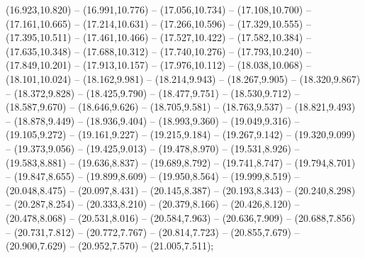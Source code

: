 (16.923,10.820) -- (16.991,10.776) -- (17.056,10.734) -- (17.108,10.700) -- (17.161,10.665) -- (17.214,10.631) -- (17.266,10.596) -- (17.329,10.555) -- (17.395,10.511) -- (17.461,10.466) -- (17.527,10.422) -- (17.582,10.384) -- (17.635,10.348) -- (17.688,10.312) -- (17.740,10.276) -- (17.793,10.240) -- (17.849,10.201) -- (17.913,10.157) -- (17.976,10.112) -- (18.038,10.068) -- (18.101,10.024) -- (18.162,9.981) -- (18.214,9.943) -- (18.267,9.905) -- (18.320,9.867) -- (18.372,9.828) -- (18.425,9.790) -- (18.477,9.751) -- (18.530,9.712) -- (18.587,9.670) -- (18.646,9.626) -- (18.705,9.581) -- (18.763,9.537) -- (18.821,9.493) -- (18.878,9.449) -- (18.936,9.404) -- (18.993,9.360) -- (19.049,9.316) -- (19.105,9.272) -- (19.161,9.227) -- (19.215,9.184) -- (19.267,9.142) -- (19.320,9.099) -- (19.373,9.056) -- (19.425,9.013) -- (19.478,8.970) -- (19.531,8.926) -- (19.583,8.881) -- (19.636,8.837) -- (19.689,8.792) -- (19.741,8.747) -- (19.794,8.701) -- (19.847,8.655) -- (19.899,8.609) -- (19.950,8.564) -- (19.999,8.519) -- (20.048,8.475) -- (20.097,8.431) -- (20.145,8.387) -- (20.193,8.343) -- (20.240,8.298) -- (20.287,8.254) -- (20.333,8.210) -- (20.379,8.166) -- (20.426,8.120) -- (20.478,8.068) -- (20.531,8.016) -- (20.584,7.963) -- (20.636,7.909) -- (20.688,7.856) -- (20.731,7.812) -- (20.772,7.767) -- (20.814,7.723) -- (20.855,7.679) -- (20.900,7.629) -- (20.952,7.570) -- (21.005,7.511);
